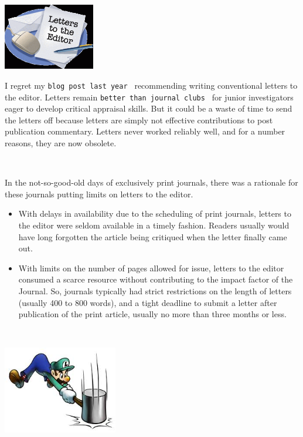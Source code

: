 \documentclass[11pt,twoside,a4paper]{article}
\begin{document}
\begin{minipage}[h]{4.25cm}
	\includegraphics[width=4.00cm]{img/letter-to-editor-scaled500-300x217.png}
\end{minipage} \hfill \begin{minipage}[h]{14.75cm}
	I regret my \texttt{blog post last year~\footnotemark } recommending writing conventional letters to the editor. Letters remain \texttt{better than journal clubs~\footnotemark } for junior investigators eager to develop critical appraisal skills. But it could be a waste of time to send the letters off because letters are simply not effective contributions to post publication commentary. Letters never worked reliably well, and for a number reasons, they are now obsolete. ~\\
\end{minipage} ~\\

\begin{minipage}[h]{13.75cm}
	In the not-so-good-old days of exclusively print journals, there was a rationale for these journals putting limits on letters to the editor.
	\begin{itemize}
		\item With delays in availability due to the scheduling of print journals, letters to the editor were seldom available in a timely fashion. Readers usually would have long forgotten the article being critiqued when the letter finally came out.
		\item With limits on the number of pages allowed for issue, letters to the editor consumed a scarce resource without contributing to the impact factor of the Journal. So, journals typically had strict restrictions on the length of letters (usually 400 to 800 words), and a tight deadline to submit a letter after publication of the print article, usually no more than three months or less.
	\end{itemize} ~\\
\end{minipage} \hfill \begin{minipage}[h]{5.25cm}
	\includegraphics[width=5.00cm]{img/hammering3pg.jpg}
\end{minipage}
\end{document}
